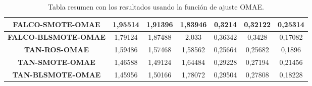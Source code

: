 \begin{table}[H]
{\begin{tabular}{|ccccccc|}
\multicolumn{1}{|c|}{\textbf{FALCO-SMOTE-OMAE}}   & \multicolumn{1}{c|}{1,95514}           & \multicolumn{1}{c|}{1,91396}             & \multicolumn{1}{c|}{1,83946}       & \multicolumn{1}{c|}{0,3214}            & \multicolumn{1}{c|}{0,32122}             & 0,25314       \\ \hline
\multicolumn{1}{|c|}{\textbf{FALCO-BLSMOTE-OMAE}} & \multicolumn{1}{c|}{1,79124}           & \multicolumn{1}{c|}{1,87488}             & \multicolumn{1}{c|}{2,033}         & \multicolumn{1}{c|}{0,36342}           & \multicolumn{1}{c|}{0,3428}              & 0,17082       \\ \hline
\multicolumn{1}{|c|}{\textbf{TAN-ROS-OMAE}}       & \multicolumn{1}{c|}{1,59486}           & \multicolumn{1}{c|}{1,57468}             & \multicolumn{1}{c|}{1,58562}       & \multicolumn{1}{c|}{0,25664}           & \multicolumn{1}{c|}{0,25682}             & 0,1896        \\ \hline
\multicolumn{1}{|c|}{\textbf{TAN-SMOTE-OMAE}}     & \multicolumn{1}{c|}{1,46588}           & \multicolumn{1}{c|}{1,49124}             & \multicolumn{1}{c|}{1,64484}       & \multicolumn{1}{c|}{0,29228}           & \multicolumn{1}{c|}{0,27194}             & 0,21456       \\ \hline
\multicolumn{1}{|c|}{\textbf{TAN-BLSMOTE-OMAE}}   & \multicolumn{1}{c|}{1,45956}           & \multicolumn{1}{c|}{1,50166}             & \multicolumn{1}{c|}{1,78072}       & \multicolumn{1}{c|}{0,29504}           & \multicolumn{1}{c|}{0,27808}             & 0,18228       \\ \hline
\end{tabular}%
}
\caption{Tabla resumen con los resultados usando la función de ajuste OMAE.}\label{resumenOMAE}
\end{table}


